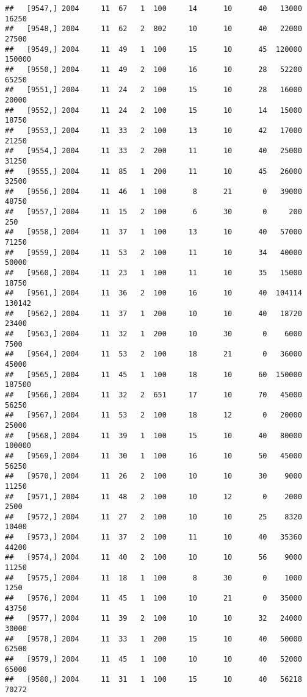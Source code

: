 \documentclass{article}\usepackage[]{graphicx}\usepackage[]{color}
\makeatletter
\newenvironment{kframe}{%
 \def\at@end@of@kframe{}%
 \ifinner\ifhmode%
  \def\at@end@of@kframe{\end{minipage}}%
  \begin{minipage}{\columnwidth}%
 \fi\fi%
 \def\FrameCommand##1{\hskip\@totalleftmargin \hskip-\fboxsep
 \colorbox{shadecolor}{##1}\hskip-\fboxsep
     \hskip-\linewidth \hskip-\@totalleftmargin \hskip\columnwidth}%
 \MakeFramed {\advance\hsize-\width
   \@totalleftmargin\z@ \linewidth\hsize
   \@setminipage}}%
 {\par\unskip\endMakeFramed%
 \at@end@of@kframe}
\newenvironment{knitrout}{}{} %
\makeatother
\begin{document}
\begin{knitrout}
\begin{kframe}
\begin{verbatim}
##   [9547,] 2004     11  67   1  100     14      10      40   13000   16250
##   [9548,] 2004     11  62   2  802     10      10      40   22000   27500
##   [9549,] 2004     11  49   1  100     15      10      45  120000  150000
##   [9550,] 2004     11  49   2  100     16      10      28   52200   65250
##   [9551,] 2004     11  24   2  100     15      10      28   16000   20000
##   [9552,] 2004     11  24   2  100     15      10      14   15000   18750
##   [9553,] 2004     11  33   2  100     13      10      42   17000   21250
##   [9554,] 2004     11  33   2  200     11      10      40   25000   31250
##   [9555,] 2004     11  85   1  200     11      10      45   26000   32500
##   [9556,] 2004     11  46   1  100      8      21       0   39000   48750
##   [9557,] 2004     11  15   2  100      6      30       0     200     250
##   [9558,] 2004     11  37   1  100     13      10      40   57000   71250
##   [9559,] 2004     11  53   2  100     11      10      34   40000   50000
##   [9560,] 2004     11  23   1  100     11      10      35   15000   18750
##   [9561,] 2004     11  36   2  100     16      10      40  104114  130142
##   [9562,] 2004     11  37   1  200     10      10      40   18720   23400
##   [9563,] 2004     11  32   1  200     10      30       0    6000    7500
##   [9564,] 2004     11  53   2  100     18      21       0   36000   45000
##   [9565,] 2004     11  45   1  100     18      10      60  150000  187500
##   [9566,] 2004     11  32   2  651     17      10      70   45000   56250
##   [9567,] 2004     11  53   2  100     18      12       0   20000   25000
##   [9568,] 2004     11  39   1  100     15      10      40   80000  100000
##   [9569,] 2004     11  30   1  100     16      10      50   45000   56250
##   [9570,] 2004     11  26   2  100     10      10      30    9000   11250
##   [9571,] 2004     11  48   2  100     10      12       0    2000    2500
##   [9572,] 2004     11  27   2  100     10      10      25    8320   10400
##   [9573,] 2004     11  37   2  100     11      10      40   35360   44200
##   [9574,] 2004     11  40   2  100     10      10      56    9000   11250
##   [9575,] 2004     11  18   1  100      8      30       0    1000    1250
##   [9576,] 2004     11  45   1  100     10      21       0   35000   43750
##   [9577,] 2004     11  39   2  100     10      10      32   24000   30000
##   [9578,] 2004     11  33   1  200     15      10      40   50000   62500
##   [9579,] 2004     11  45   1  100     10      10      40   52000   65000
##   [9580,] 2004     11  31   1  100     15      10      40   56218   70272

\end{verbatim}
\end{kframe}
\end{knitrout}
\end{document}

